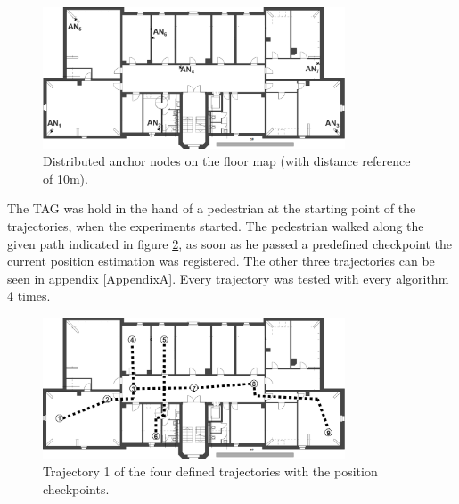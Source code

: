 \begin{figure}[th]
\centering
\includegraphics[width=0.8\textwidth]{Figures/anchor_position}
\decoRule
\caption[Anchor Node Positions]{Distributed anchor nodes on the floor map (with distance reference of 10m).}
\label{fig:anchor_position}
\end{figure}

The TAG was hold in the hand of a pedestrian at the starting point of the trajectories, when the experiments started. The pedestrian walked along the given path indicated in figure \ref{fig:trajectory1}, as soon as he passed a predefined checkpoint the current position estimation was registered. The other three trajectories can be seen in appendix \ref{AppendixA}. Every trajectory was tested with every algorithm 4 times.

\begin{figure}[th]
\centering
\includegraphics[width=0.8\textwidth]{Figures/trajectory1}
\decoRule
\caption[Trajectory 1]{Trajectory 1 of the four defined trajectories with the position checkpoints.}
\label{fig:trajectory1}
\end{figure}